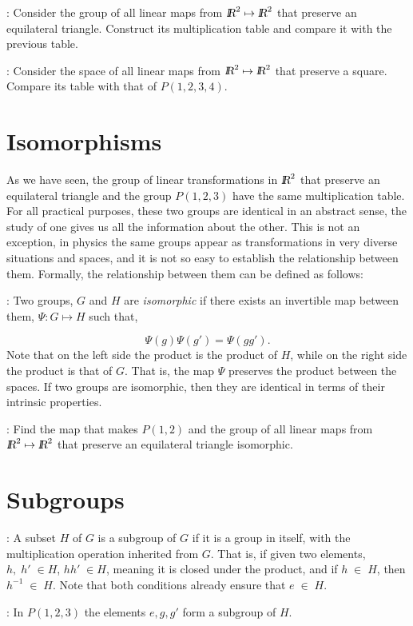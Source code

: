 \ejer:
Consider the group of all linear maps from $\re^{2} \mapsto \re^{2}$ that preserve an equilateral triangle. Construct its multiplication table and compare it with the previous table.

\ejer: Consider the space of all linear maps from $\re^{2} \mapsto \re^{2}$ that preserve a square.
Compare its table with that of $P(1,2,3,4)$.

\section{Isomorphisms}

As we have seen, the group of linear transformations in $\mbox{\sl {l$\!\!\!\;\:\!$R}}^{2}$ that preserve an equilateral triangle and the group $P(1,2,3)$ have the same multiplication table. For all practical purposes, these two groups are identical in an abstract sense, the study of one gives us all the information about the other. This is not an exception, in physics the same groups appear as transformations in very diverse situations and spaces, and it is not so easy to establish the relationship between them. Formally, the relationship between them can be defined as follows:

: Two groups, $G$ and $H$ are {\sl isomorphic} if there exists an invertible map between them, 
$\Psi: G \mapsto H$ such that,

\[
\Psi(g) \Psi(g') = \Psi(gg').
\]
 Note that on the left side the product is the product of $H$, while on the right side the product is that of $G$. That is, the map $\Psi$ preserves the product between the spaces. If two groups are isomorphic, then they are identical in terms of their intrinsic properties.
 
 \ejer: Find the map that makes $P(1,2)$ and the group of all linear maps from $\re^{2} \mapsto \re^{2}$ that preserve an equilateral triangle isomorphic.
 
 \section{Subgroups}
 
 : A subset $H$ of $G$ is a subgroup of $G$ if it is a group in itself, with the multiplication operation inherited from $G$. That is, if given two elements, $h, \; h' \; \in H$, $hh' \; \in H$, meaning it is closed under the product, and if $h \;\in \; H$, then $h^{-1} \;\in \; H$. Note that both conditions already ensure that $e \;\in \; H$.
 
 \ejem: In $P(1,2,3)$ the elements $e,g,g'$ form a subgroup of $H$.
 
